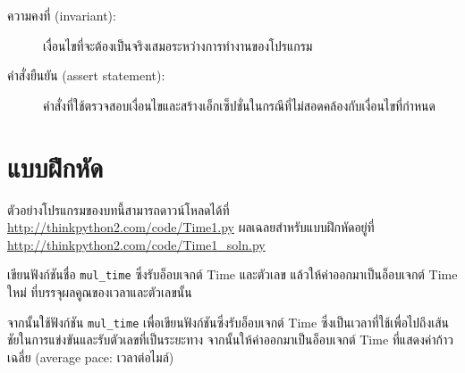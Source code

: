 \begin{description}

\item[ความคงที่ (invariant):] เงื่อนไขที่จะต้องเป็นจริงเสมอระหว่างการทำงานของโปรแกรม


\item[คำสั่งยืนยัน (assert statement):] คำสั่งที่ใช้ตรวจสอบเงื่อนไขและสร้างเอ็กเซ็ปชั่นในกรณีที่ไม่สอดคล้องกับเงื่อนไขที่กำหนด

\end{description}

\section{แบบฝึกหัด}



ตัวอย่างโปรแกรมของบทนี้สามารถดาวน์โหลดได้ที่ \url{http://thinkpython2.com/code/Time1.py} 
ผลเฉลยสำหรับแบบฝึกหัดอยู่ที่ \url{http://thinkpython2.com/code/Time1_soln.py}

\begin{exercise}


เขียนฟังก์ชันชื่อ \verb"mul_time" ซึ่งรับอ็อบเจกต์ Time และตัวเลข แล้วให้ค่าออกมาเป็นอ็อบเจกต์ Time ใหม่ ที่บรรจุผลคูณของเวลาและตัวเลขนั้น


จากนั้นใช้ฟังก์ชัน \verb"mul_time" เพื่อเขียนฟังก์ชันซึ่งรับอ็อบเจกต์ Time 
ซึ่งเป็นเวลาที่ใช้เพื่อไปถึงเส้นชัยในการแข่งขันและรับตัวเลขที่เป็นระยะทาง จากนั้นให้ค่าออกมาเป็นอ็อบเจกต์ Time 
ที่แสดงค่าก้าวเฉลี่ย (average pace: เวลาต่อไมล์)

\end{exercise}


